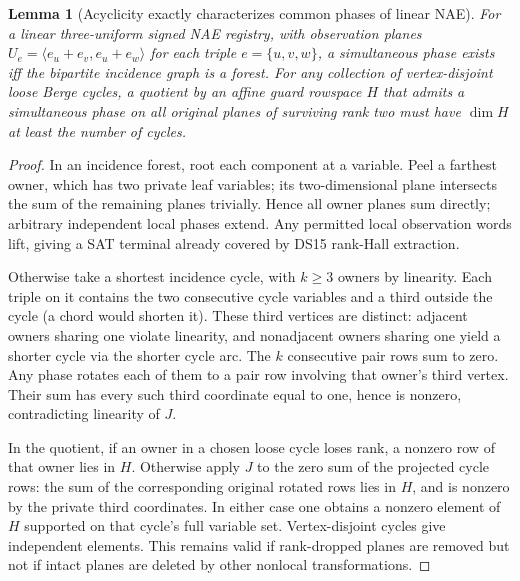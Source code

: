 \documentclass[11pt]{article}
\newtheorem{lemma}[theorem]{Lemma}
\begin{document}
\begin{lemma}[Acyclicity exactly characterizes common phases of linear NAE]\label{lem:ba17-cycle}
For a linear three-uniform signed NAE registry, with observation planes $U_e=\langle e_u+e_v,e_u+e_w\rangle$ for each triple $e=\{u,v,w\}$, a simultaneous phase exists iff the bipartite incidence graph is a forest. For any collection of vertex-disjoint loose Berge cycles, a quotient by an affine guard rowspace $H$ that admits a simultaneous phase on all original planes of surviving rank two must have $\dim H$ at least the number of cycles.
\end{lemma}
\begin{proof}
In an incidence forest, root each component at a variable. Peel a farthest owner, which has two private leaf variables; its two-dimensional plane intersects the sum of the remaining planes trivially. Hence all owner planes sum directly; arbitrary independent local phases extend. Any permitted local observation words lift, giving a SAT terminal already covered by DS15 rank-Hall extraction.

Otherwise take a shortest incidence cycle, with $k\ge3$ owners by linearity. Each triple on it contains the two consecutive cycle variables and a third outside the cycle (a chord would shorten it). These third vertices are distinct: adjacent owners sharing one violate linearity, and nonadjacent owners sharing one yield a shorter cycle via the shorter cycle arc. The $k$ consecutive pair rows sum to zero. Any phase rotates each of them to a pair row involving that owner's third vertex. Their sum has every such third coordinate equal to one, hence is nonzero, contradicting linearity of $J$.

In the quotient, if an owner in a chosen loose cycle loses rank, a nonzero row of that owner lies in $H$. Otherwise apply $J$ to the zero sum of the projected cycle rows: the sum of the corresponding original rotated rows lies in $H$, and is nonzero by the private third coordinates. In either case one obtains a nonzero element of $H$ supported on that cycle's full variable set. Vertex-disjoint cycles give independent elements. This remains valid if rank-dropped planes are removed but not if intact planes are deleted by other nonlocal transformations.
\end{proof}
\end{document}
